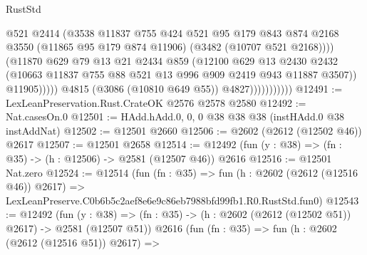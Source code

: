\begin{lexlean}{RustStd}
\begin{coremodule}
                                    @521
                                    @2414
                                    (@3538
                                      @11837
                                      @755
                                      @424
                                      @521
                                      @95
                                      @179
                                      @843
                                      @874
                                      @2168
                                      @3550
                                      (@11865 @95 @179 @874 @11906)
                                      (@3482 (@10707 @521 @2168))))
                                  (@11870
                                    @629
                                    @79
                                    @13
                                    @21
                                    @2434
                                    @859
                                    (@12100
                                      @629
                                      @13
                                      @2430
                                      @2432
                                      (@10663
                                        @11837
                                        @755
                                        @88
                                        @521
                                        @13
                                        @996
                                        @909
                                        @2419
                                        @943
                                        @11887
                                        @3507))
                                    @11905)))))
                          @4815
                          (@3086 (@10810 @649 @55))
                          @4827)))))))))))
@12491 := LexLeanPreservation.Rust.CrateOK @2576 @2578 @2580
@12492 := Nat.casesOn.{0}
@12501 := HAdd.hAdd.{0, 0, 0} @38 @38 @38 (instHAdd.{0} @38 instAddNat)
@12502 := @12501 @2660
@12506 := @2602 (@2612 (@12502 @46)) @2617
@12507 := @12501 @2658
@12514 := @12492 (fun (y : @38) => (fn : @35) -> (h : @12506) -> @2581 (@12507 @46)) @2616
@12516 := @12501 Nat.zero
@12524 := @12514
    (fun (fn : @35) =>
    fun (h : @2602 (@2612 (@12516 @46)) @2617) =>
    LexLeanPreserve.C0b6b5c2aef8e6e9c86eb7988bfd99fb1.R0.RustStd.fun0)
@12543 := @12492
    (fun (y : @38) => (fn : @35) -> (h : @2602 (@2612 (@12502 @51)) @2617) -> @2581 (@12507 @51))
    @2616
    (fun (fn : @35) =>
    fun (h : @2602 (@2612 (@12516 @51)) @2617) =>

\end{coremodule}
\end{lexlean}
